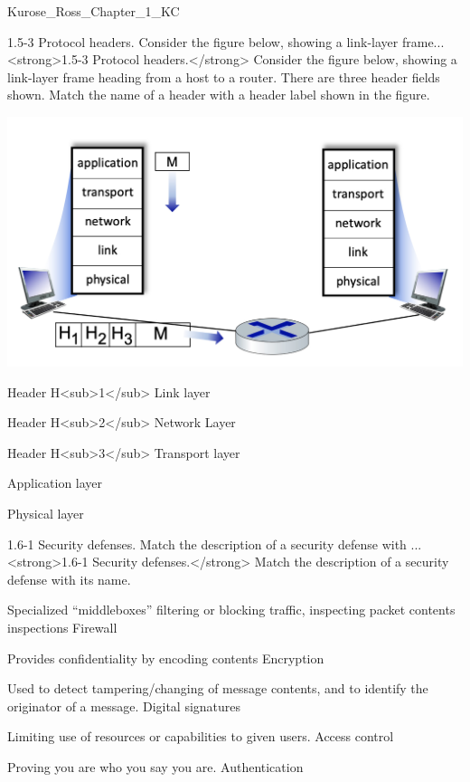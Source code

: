 \documentclass[a4paper]{article}
\begin{document}
\begin{quiz}{Kurose_Ross_Chapter_1_KC}
\begin{matching}[
	points=1,
	penalty=0.33333,
]{1.5-3 Protocol headers. Consider the figure below, showing a link-layer frame...}
<strong>1.5-3 Protocol headers.</strong> Consider the figure below, showing a link-layer frame heading from a host to a router.  There are three header fields shown.  Match the name of a header with a header label shown in the figure. 
\begin{center}
\includegraphics[width=\linewidth]{figs/1.5.3.jpg}
\end{center}

\item Header H<sub>1</sub> \answer Link layer
\item Header H<sub>2</sub> \answer Network Layer
\item Header H<sub>3</sub> \answer Transport layer
\item \answer Application layer
\item \answer Physical layer
\end{matching}

\begin{matching}[
	points=1,
	penalty=0.33333,
]{1.6-1 Security defenses.  Match the description of a security defense with ...}
<strong>1.6-1 Security defenses.</strong>  Match the description of a security defense with its name.
\item Specialized “middleboxes” filtering or blocking traffic, inspecting packet contents inspections \answer Firewall
\item Provides confidentiality by encoding contents \answer Encryption
\item Used to detect tampering/changing of message contents, and to identify the originator of a message. \answer Digital signatures
\item Limiting use of resources or capabilities to given users. \answer Access control
\item Proving you are who you say you are. \answer Authentication
\end{matching}


\end{quiz}
\end{document}
